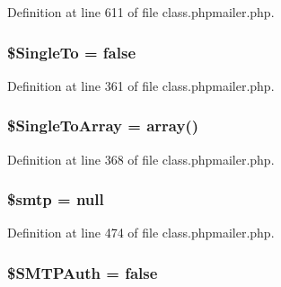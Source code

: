 Definition at line 611 of file class.\+phpmailer.\+php.

\subsubsection[{\texorpdfstring{\$\+Single\+To}{$SingleTo}}]{\setlength{\rightskip}{0pt plus 5cm}\$Single\+To = false}\hypertarget{class_p_h_p_mailer_a7c792e2e3e3cb98d869c9a68b73bc3a0}{}\label{class_p_h_p_mailer_a7c792e2e3e3cb98d869c9a68b73bc3a0}


Definition at line 361 of file class.\+phpmailer.\+php.

\subsubsection[{\texorpdfstring{\$\+Single\+To\+Array}{$SingleToArray}}]{\setlength{\rightskip}{0pt plus 5cm}\$Single\+To\+Array = array()}\hypertarget{class_p_h_p_mailer_a1a4e8b669019fd06e46df4ad0ef47ec4}{}\label{class_p_h_p_mailer_a1a4e8b669019fd06e46df4ad0ef47ec4}


Definition at line 368 of file class.\+phpmailer.\+php.

\subsubsection[{\texorpdfstring{\$smtp}{$smtp}}]{\setlength{\rightskip}{0pt plus 5cm}\$smtp = null\hspace{0.3cm}{\ttfamily [protected]}}\hypertarget{class_p_h_p_mailer_aad8f984db037346667c0ca16ed00af60}{}\label{class_p_h_p_mailer_aad8f984db037346667c0ca16ed00af60}


Definition at line 474 of file class.\+phpmailer.\+php.

\subsubsection[{\texorpdfstring{\$\+S\+M\+T\+P\+Auth}{$SMTPAuth}}]{\setlength{\rightskip}{0pt plus 5cm}\$S\+M\+T\+P\+Auth = false}\hypertarget{class_p_h_p_mailer_aba02a4c8ff018b73b192831a761fe9ca}{}\label{class_p_h_p_mailer_aba02a4c8ff018b73b192831a761fe9ca}


